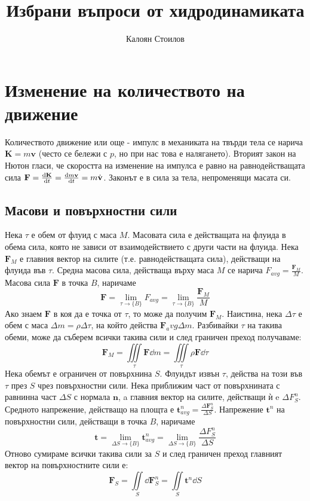 \documentclass[bulgarian, 12pt]{article}
\title{Избрани въпроси от хидродинамиката}
\author{Калоян Стоилов}
\begin{document}
\maketitle

\section{Изменение на количеството на движение}
Количеството движение или още - импулс в механиката на твърди тела се нарича $\mathbf{K} = m\mathbf{v}$ (често се бележи с $p$, но при нас това е налягането).
Вторият закон на Нютон гласи, че скоростта на изменение на импулса е равно на равнодействащата сила $\mathbf{F} = \dv{\mathbf{K}}{t} = \dv{m\mathbf{v}}{t}= m \dot{\mathbf{v}}$. 
Законът е в сила за тела, непроменящи масата си.

\subsection{Масови и повърхностни сили}
Нека $\tau$ е обем от флуид с маса $M$. 
Масовата сила е действащата на флуида в обема сила, която не зависи от взаимодействието с други части на флуида. 
Нека $\mathbf{F}_M$ е главния вектор на силите (т.е. равнодействащата сила), действащи на флуида във $\tau$.
Средна масова сила, действаща върху маса $M$ се нарича $F_{avg} = \frac{\mathbf{F}_M}{M}$.
Масова сила $\mathbf{F}$ в точка $B$, наричаме
\begin{equation}
	\mathbf{F} = \lim_{\tau \to \{B\}} F_{avg} = \lim_{\tau \to \{B\}} \frac{\mathbf{F}_M}{M}
\end{equation}
Ако знаем $\mathbf{F}$ в коя да е точка от $\tau$, то може да получим $\mathbf{F}_M$.
Наистина, нека $\Delta \tau$ е обем с маса $\Delta m = \rho \Delta \tau$, на който действа $\mathbf{F}_avg \Delta m$.
Разбивайки $\tau$ на такива обеми, може да съберем всички такива сили и след граничен преход получаваме:
\begin{equation}
	\mathbf{F}_M = \iiint\limits_{\tau} \mathbf{F} \dd m = \iiint\limits_{\tau} \rho \mathbf{F} \dd \tau
\end{equation}
Нека обемът е ограничен от повърхнина $S$. Флуидът извън $\tau$, действа на този във $\tau$ през $S$ чрез повърхностни сили.
Нека приближим част от повърхнината с равнинна част $\Delta S$ с нормала $\mathbf{n}$, a главния вектор на силите, действащи ѝ e $\Delta F_S^n$.
Средното напрежение, действащо на площта е $\mathbf{t}_{avg}^n = \frac{\Delta \mathbf{F}_S^n}{\Delta S}$. 
Напрежение $\mathbf{t}^n$ на повърхностни сили, действащи в точка $B$, наричаме
\begin{equation}
	\mathbf{t} = \lim_{\Delta S \to \{B\}} \mathbf{t}_{avg}^n = \lim_{\Delta S \to \{B\}} \frac{\Delta F_S^n}{\Delta S}
\end{equation}
Отново сумираме всички такива сили за $S$ и след граничен преход главният вектор на повърхностните сили е:
\begin{equation}
	\mathbf{F}_S = \iint\limits_{S} \dd \mathbf{F}_S^n = \iint\limits_{S} \mathbf{t}^n \dd S
\end{equation}
\end{document}
